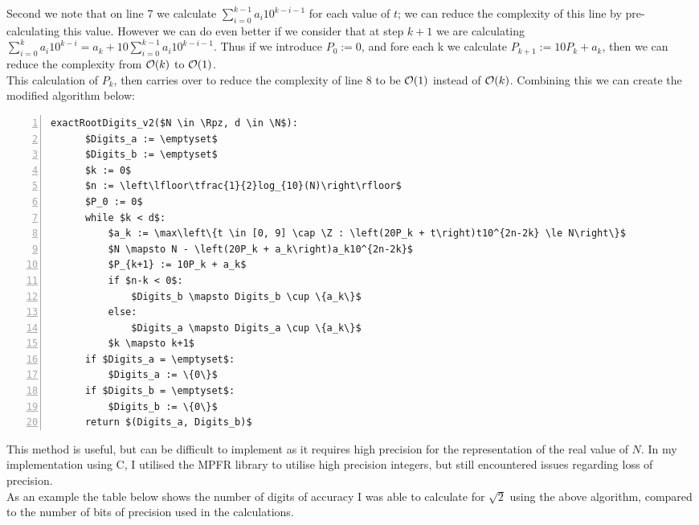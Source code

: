 Second we note that on line 7 we calculate \(\sum_{i=0}^{k-1}a_i10^{k-i-1}\) for each value of \(t\); we can reduce the complexity of this line by pre-calculating this value. However we can do even better if we consider that at step \(k+1\) we are calculating \(\sum_{i=0}^{k}a_i10^{k-i} = a_k + 10\sum_{i=0}^{k-1}a_i10^{k-i-1}\). Thus if we introduce \(P_0 := 0\), and fore each k we calculate \(P_{k+1} := 10P_k + a_k\), then we can reduce the complexity from \(\mathcal{O}(k)\) to \(\mathcal{O}(1)\).\\

This calculation of \(P_k\), then carries over to reduce the complexity of line 8 to be \(\mathcal{O}(1)\) instead of \(\mathcal{O}(k)\). Combining this we can create the modified algorithm below:

\begin{lstlisting}[numbers=left,frame=single,mathescape,caption={Exact Digit by Digits Square Root version 2}]
  exactRootDigits_v2($N \in \Rpz, d \in \N$):
      $Digits_a := \emptyset$
      $Digits_b := \emptyset$
      $k := 0$
      $n := \left\lfloor\tfrac{1}{2}log_{10}(N)\right\rfloor$
      $P_0 := 0$
      while $k < d$:
          $a_k := \max\left\{t \in [0, 9] \cap \Z : \left(20P_k + t\right)t10^{2n-2k} \le N\right\}$
          $N \mapsto N - \left(20P_k + a_k\right)a_k10^{2n-2k}$
          $P_{k+1} := 10P_k + a_k$
          if $n-k < 0$:
              $Digits_b \mapsto Digits_b \cup \{a_k\}$
          else:
              $Digits_a \mapsto Digits_a \cup \{a_k\}$
          $k \mapsto k+1$
      if $Digits_a = \emptyset$:
          $Digits_a := \{0\}$
      if $Digits_b = \emptyset$:
          $Digits_b := \{0\}$
      return $(Digits_a, Digits_b)$
\end{lstlisting}

This method is useful, but can be difficult to implement as it requires high precision for the representation of the real value of \(N\). In my implementation using C, I utilised the MPFR library to utilise high precision integers, but still encountered issues regarding loss of precision.\\

As an example the table below shows the number of digits of accuracy I was able to calculate for \(\sqrt{2}\) using the above algorithm, compared to the number of bits of precision used in the calculations.\\

